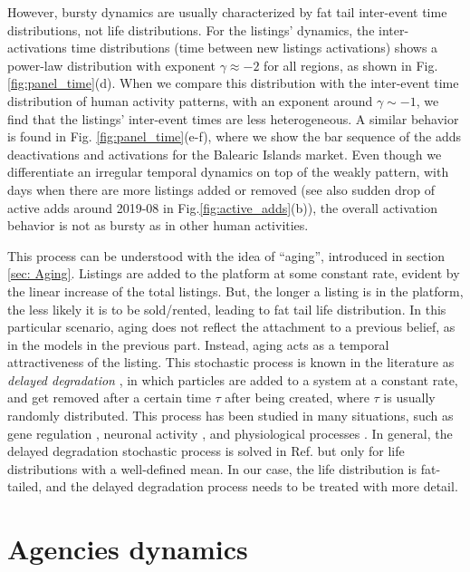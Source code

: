 However, bursty dynamics are usually characterized by fat tail inter-event time distributions, not life distributions. For the listings' dynamics, the inter-activations time distributions (time between new listings activations) shows a power-law distribution with exponent $\gamma \approx -2$ for all regions, as shown in Fig. \ref{fig:panel_time}(d). When we compare this distribution with the inter-event time distribution of human activity patterns, with an exponent around $\gamma \sim -1$, we find that the listings' inter-event times are less heterogeneous. A similar behavior is found in Fig. \ref{fig:panel_time}(e-f), where we show the bar sequence of the adds deactivations and activations for the Balearic Islands market. Even though we differentiate an irregular temporal dynamics on top of the weakly pattern, with days when there are more listings added or removed (see also sudden drop of active adds around 2019-08 in Fig.\ref{fig:active_adds}(b)), the overall activation behavior is not as bursty as in other human activities.

This process can be understood with the idea of ``aging'', introduced in section \ref{sec: Aging}. Listings are added to the platform at some constant rate, evident by the linear increase of the total listings. But, the longer a listing is in the platform, the less likely it is to be sold/rented, leading to fat tail life distribution. In this particular scenario, aging does not reflect the attachment to a previous belief, as in the models in the previous part. Instead, aging acts as a temporal attractiveness of the listing. This stochastic process is known in the literature as \textit{delayed degradation} \cite{lafuerza2013stochastic}, in which particles are added to a system at a constant rate, and get removed after a certain time $\tau$ after being created, where $\tau$ is usually randomly distributed. This process has been studied in many situations, such as gene regulation \cite{lewis2003autoinhibition, barrio2006oscillatory, bratsun2005delay}, neuronal activity \cite{flunkert2013dynamics}, and physiological processes \cite{longtin1990noise}. In general, the delayed degradation stochastic process is solved in Ref. \cite{lafuerza2013stochastic} but only for life distributions with a well-defined mean. In our case, the life distribution is fat-tailed, and the delayed degradation process needs to be treated with more detail.

\section{Agencies dynamics}

